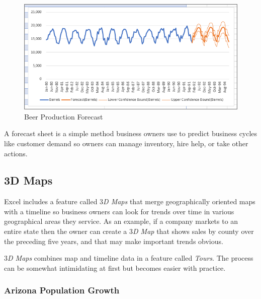 \begin{figure}[H]
	\centering
	\includegraphics[width=\maxwidth{.95\linewidth}]{gfx/ch08_fig13}
	\caption{Beer Production Forecast}
	\label{08:fig13}
\end{figure}

A forecast sheet is a simple method business owners use to predict business cycles like customer demand so owners can manage inventory, hire help, or take other actions.

\subsection{3D Maps}

Excel includes a feature called \textit{$ 3 $D Maps} that merge geographically oriented maps with a timeline so business owners can look for trends over time in various geographical areas they service. As an example, if a company markets to an entire state then the owner can create a \textit{$ 3 $D Map} that shows sales by county over the preceding five years, and that may make important trends obvious.

\textit{$ 3 $D Maps} combines map and timeline data in a feature called \textit{Tours}. The process can be somewhat intimidating at first but becomes easier with practice.

\subsubsection{Arizona Population Growth}

